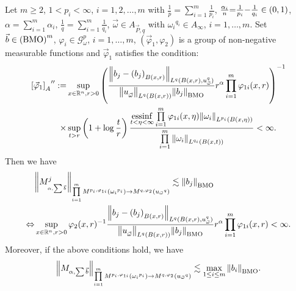 \documentclass[11pt, twoside, leqno]{article}
\begin{document}
\begin{thm}\label{CCFRM2}
	Let $m\geq 2$, $1< p_i<\infty$, $i=1,2,\ldots,m$ with $\frac{1}{p} = \sum\limits_{i = 1}^m {\frac{1}{{{p_i}}}}$, $\frac{{{\alpha _i}}}{n}{\rm{ = }}\frac{1}{{{p_i}}}{\rm{ - }}\frac{1}{{{q_i}}} \in (0,1)$, $\alpha  = \sum\limits_{i = 1}^m {{\alpha _i}}$, $\frac{1}{q} = \sum\limits_{i = 1}^m {\frac{1}{{{q_i}}}}$, $\vec{\omega}\in {A_{\vec P,q}}$ with ${\omega _i}^{{q_i}} \in {A_\infty }$, $i = 1, \ldots ,m$. Set $\vec b \in {\left( {\rm BMO} \right)^m}$, ${\varphi _i} \in \mathcal{G}_\omega ^p$, $i = 1, \ldots ,m$, $({{\vec \varphi }_1},{\varphi _2})$ is a group of non-negative measurable functions and ${{\vec \varphi }_1}$ satisfies the condition:
	\begin{align}\label{cen3}
	{\left[ {{{\vec \varphi }_1}} \right]_A}^{\prime \prime }: =& \mathop {\sup }\limits_{x \in {{\mathbb R^n}},r > 0} {\left( {\frac{{{{\left\| {{b_j} - {{({b_j})}_{B(x,r)}}} \right\|}_{{L^q}{(B(x,r),u_{\vec \omega }^q)}}}}}{{{{\left\| {u_{\vec \omega }^{}} \right\|}_{{L^q}(B(x,r))}}{{\left\| {{b_j}} \right\|}_{\rm BMO}}}}{r^\alpha }\prod\limits_{i = 1}^m {{\varphi _{1i}}(x,r)} } \right)^{-1}}\notag\\
	\times& \mathop {\sup }\limits_{t > r} \left( {1 + \log \frac{t}{r}} \right)\frac{{\mathop {{\rm{essinf}}}\limits_{t < \eta  < \infty } \prod\limits_{i = 1}^m {{\varphi _{1i}}(x,\eta ){{\left\| {{\omega _i}} \right\|}_{{L^{{p_i}}}(B(x,\eta ))}}} }}{{\prod\limits_{i = 1}^m {{{\left\| {{\omega _i}} \right\|}_{{L^{{q_i}}}(B(x,t))}}} }} < \infty.
	\end{align}
	Then we have
	\begin{align}
	&{\left\| {M_{_{\alpha ,\sum {\vec b} }}^j} \right\|_{\prod\limits_{i = 1}^m {{M^{{p_i},{\varphi _{1i}}}}\left( {{\omega _i}^{{p_i}}} \right)}  \to {M^{q,{\varphi _2}}}\left( {{u_{\vec \omega }}^q} \right)}} \lesssim {\left\| {{b_j}} \right\|_{\rm BMO}}\notag\\
	\Leftrightarrow& \mathop {\sup }\limits_{x \in {{\mathbb R^n}},r > 0} {\varphi _2}{(x,r)^{ - 1}}\frac{{{{\left\| {{b_j} - {{({b_j})}_{B(x,r)}}} \right\|}_{{L^q}{(B(x,r),u_{\vec \omega }^q)}}}}}{{{{\left\| {u_{\vec \omega }^{}} \right\|}_{{L^q}(B(x,r))}}{{\left\| {{b_j}} \right\|}_{\rm BMO}}}}{r^\alpha }\prod\limits_{i = 1}^m {{\varphi _{1i}}(x,r)}  < \infty.
	\end{align}
	Moreover, if the above conditions hold, we have
	$${\left\| {{M_{\alpha ,\sum {\vec b} }}} \right\|_{\prod\limits_{i = 1}^m {{M^{{p_i},{\varphi _{1i}}}}\left( {{\omega _i}^{{p_i}}} \right)}  \to {M^{q,{\varphi _2}}}\left( {{u_{\vec \omega }}^q} \right)}} \lesssim \mathop {\max }\limits_{1 \le i \le m} {\left\| {{b_i}} \right\|_{\rm BMO}}.$$
\end{thm}
\end{document}
